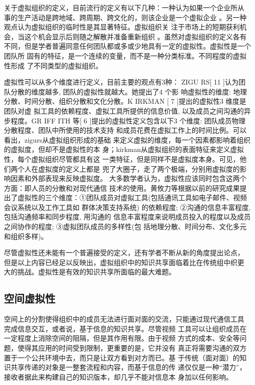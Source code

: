 \documentclass[12pt,a4paper]{ctexart}
\begin{document}
关于虚拟组织的定义，目前流行的定义有以下几种：一种认为如果一个企业所从
事的生产活动是跨地域、跨周期、跨文化的，则该企业是一个虚拟企业
\cite{1189855}。另一种观点认为虚拟组织的临时性是其显著特征。虚拟组织关
注于市场上的短期获利机会，当这个机会显示后则随之解散并准备重新组织
\cite{655269}。虽然对虚拟组织的定义各有不同，但是学者普遍同意任何团队都或多或少地具有一定的虚拟性。虚拟性是一个团队所
固有的特征，是一个连续的变量，而不是一种分类标准。不同程度的虚拟性形成
了不同类型的虚拟组织。

虚拟性可以从多个维度进行定义，目前主要的观点有3种：
ZIGU RS[ 11 ]认为团队分散的维度越多, 团队的虚拟性就越大。她提出了4 个影
响虚拟性的维度:
地理分散、时间分散、组织分散和文化分散。K IRKMAN [ 7 ]提出的虚拟性3 维度是团队对虚
拟工具的依赖程度、虚拟工具所提供的信息价值, 以及成员之间沟通的异步程度。GR IFF ITH
等[ 6 ]提出的虚拟性定义包含以下3 个维度: 团队成员物理分散程度、团队中所使用的技术支持
和成员花费在虚拟工作上的时间比例。可以看出，zigurs从虚拟组织形成的基础
来定义虚拟的维度，每一个因素都影响着组织的虚拟度，但却不是虚拟性的本
身；kirkman从虚拟组织的表面特征来定义虚拟性，每个虚拟组织尽管都具有这
一类特征，但是同样不是虚拟度本身。可见，他们两个人在虚拟度的定义上都是
兜了大圈子，走了两个极端，分别用虚拟度的影响因素和外部表现来反映虚拟度。
大多数学者认为，虚拟性应该同时包含这两个方面：即人员的分散和对现代通信
技术的使用。黄攸力等\cite{huangyouliandliutuanjie}根据以前的研究成果提
出了虚拟性的三个维度：①团队成员对虚拟工具(包括通讯工具如电子邮件、视频会议系统以及工作工具如
群体决策支持系统) 的依赖程度; ②沟通的信息丰富程度, 包括沟通频率和同步程度, 用沟通的
信息丰富程度来说明成员投入的程度以及成员之间协作的程度; ③虚拟团队成员的多样性(包
括地理分散、时间分布、文化多元和组织多样)。

尽管虚拟性还未能有一个普遍接受的定义，还有学者不断从新的角度提出论点，
但是以上内容已经足以反映出，虚拟组织中的知识共享面临着比在传统组中织更
大的挑战。虚拟性是有效的知识共享所面临的最大难题。

\subsection{空间虚拟性}

空间上的分割使得组织中的成员无法进行面对面的交流，只能通过现代通信工具
完成信息交互，或者说，基于信息的知识共享\cite{sveiby1996tka}。尽管视频
工具可以让组织成员在一定程度上消除空间的阻隔，但是其作用有限。由于视频
方式的成本、安全等问题，使得其应用的时间受到限制，更重要的是，它并没有
真正将需要沟通的双方置于一个公共环境中去，而只是让双方看到对方而已。基
于传统（面对面）的知识共享传递的对象是一整套流程和内容，而基于信息的传
递仅仅是一种“潜力”，接收者据此来构建自己的知识版本，却几乎不能对信息本
身加以任何影响。
\end{document}
